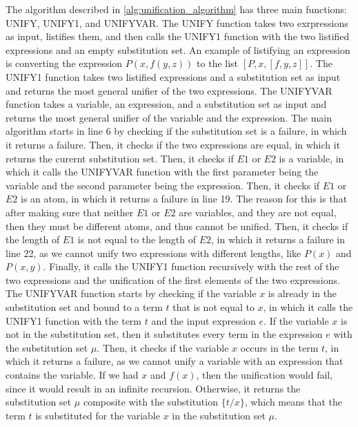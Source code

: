 \begin{itemize}
          The algorithm described in \autoref{alg:unification_algorithm} has three main functions: UNIFY, UNIFY1, and UNIFYVAR. The UNIFY function takes two exrpressions as input, listifies them, and then calls the UNIFY1 function with the two listified expressions and an empty substitution set. An example of listifying an expression is converting the expression $P(x, f(y,z))$ to the list $[P, x, [f, y, z]]$. The UNIFY1 function takes two listified expressions and a substitution set as input and returns the most general unifier of the two expressions. The UNIFYVAR function takes a variable, an expression, and a substitution set as input and returns the most general unifier of the variable and the expression. The main algorithm starts in line 6 by checking if the substitution set is a failure, in which it returns a failure. Then, it checks if the two expressions are equal, in which it returns the curernt substitution set. Then, it checks if $E1$ or $E2$ is a variable, in which it calls the UNIFYVAR function with the first parameter being the variable and the second parameter being the expression. Then, it checks if $E1$ or $E2$ is an atom, in which it returns a failure in line 19. The reason for this is that after making sure that neither $E1$ or $E2$ are variables, and they are not equal, then they must be different atoms, and thus cannot be unified. Then, it checks if the length of $E1$ is not equal to the length of $E2$, in which it returns a failure in line 22, as we cannot unify two expressions with different lengths, like $P(x)$ and $P(x, y)$. Finally, it calls the UNIFY1 function recursively with the rest of the two expressions and the unification of the first elements of the two expressions. The UNIFYVAR function starts by checking if the variable $x$ is already in the substitution set and bound to a term $t$ that is not equal to $x$, in which it calls the UNIFY1 function with the term $t$ and the input expression $e$. If the variable $x$ is not in the substitution set, then it substitutes every term in the expression $e$ with the substitution set $\mu$. Then, it checks if the variable $x$ occurs in the term $t$, in which it returns a failure, as we cannot unify a variable with an expression that contains the variable. If we had $x$ and $f(x)$, then the unification would fail, since it would result in an infinite recursion.
          Otherwise, it returns the substitution set $\mu$ composite with the substitution $\{t/x\}$, which means that the term $t$ is substituted for the variable $x$ in the substitution set $\mu$.


\end{itemize}
